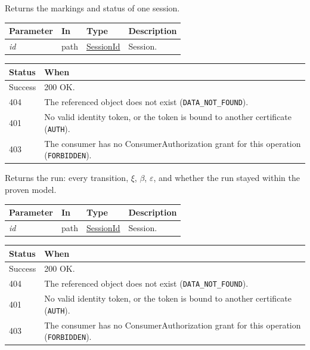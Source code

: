 \documentclass[a4paper]{arrowhead}
\newcommand{\fparam}[1]{\textit{\textcolor{ArrowheadBlue}{#1}}}
\newcommand{\pref}[1]{{\textcolor{ArrowheadGrey}{\hyperref[sec:model:primitives:#1]{#1}}}}
\begin{document}
Returns the markings and status of one session.

{\small
\begin{longtable}{|p{3.0cm}|p{1.4cm}|p{3.2cm}|p{8.2cm}|}

\hline
\rowcolor{gray!33} Parameter & In & Type & Description \\ \hline
\endhead
\fparam{id} & path & \pref{SessionId} & Session. \\ \hline
\end{longtable}
}


{\small
\begin{longtable}{|p{2.0cm}|p{13.8cm}|}

\hline
\rowcolor{gray!33} Status & When \\ \hline
\endhead
Success & 200 OK. \\ \hline
404 & The referenced object does not exist (\texttt{DATA\_NOT\_FOUND}). \\ \hline
401 & No valid identity token, or the token is bound to another certificate (\texttt{AUTH}). \\ \hline
403 & The consumer has no ConsumerAuthorization grant for this operation (\texttt{FORBIDDEN}). \\ \hline
\end{longtable}
}

Returns the run: every transition, $\xi$, $\beta$, $\varepsilon$, and whether the run stayed within the proven model.

{\small
\begin{longtable}{|p{3.0cm}|p{1.4cm}|p{3.2cm}|p{8.2cm}|}

\hline
\rowcolor{gray!33} Parameter & In & Type & Description \\ \hline
\endhead
\fparam{id} & path & \pref{SessionId} & Session. \\ \hline
\end{longtable}
}


{\small
\begin{longtable}{|p{2.0cm}|p{13.8cm}|}

\hline
\rowcolor{gray!33} Status & When \\ \hline
\endhead
Success & 200 OK. \\ \hline
404 & The referenced object does not exist (\texttt{DATA\_NOT\_FOUND}). \\ \hline
401 & No valid identity token, or the token is bound to another certificate (\texttt{AUTH}). \\ \hline
403 & The consumer has no ConsumerAuthorization grant for this operation (\texttt{FORBIDDEN}). \\ \hline
\end{longtable}
}
\end{document}
